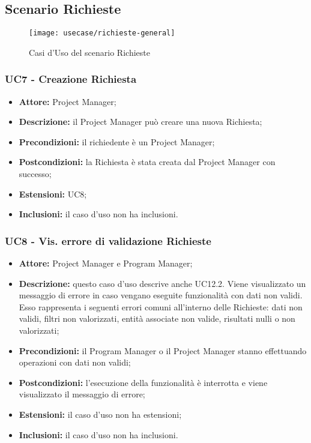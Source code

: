\subsection{Scenario Richieste}
\begin{figure}[H] 
    \centering 
    \texttt{[image: usecase/richieste-general]} 
    \caption{Casi d'Uso del scenario Richieste}
\end{figure}

\subsubsection*{UC7 - Creazione Richiesta}
\begin{itemize}[label=$\circ$]
\item \textbf{Attore:} Project Manager;
\item \textbf{Descrizione:} il Project Manager può creare una nuova Richiesta;
\item \textbf{Precondizioni:} il richiedente è un Project Manager;
\item \textbf{Postcondizioni:} la Richiesta è stata creata dal Project Manager con successo;
\item \textbf{Estensioni:} UC8;
\item \textbf{Inclusioni:} il caso d'uso non ha inclusioni.
\end{itemize}

\subsubsection*{UC8 - Vis. errore di validazione Richieste}
\begin{itemize}[label=$\circ$]
\item \textbf{Attore:} Project Manager e Program Manager;
\item \textbf{Descrizione:}  questo caso d'uso descrive anche UC12.2. Viene visualizzato un messaggio di errore in caso vengano eseguite funzionalità con dati non validi. Esso rappresenta i seguenti errori comuni all'interno delle Richieste: dati non validi, filtri non valorizzati, entità associate non valide, risultati nulli o non valorizzati;
\item \textbf{Precondizioni:} il Program Manager o il Project Manager stanno effettuando operazioni con dati non validi;
\item \textbf{Postcondizioni:} l'esecuzione della funzionalità è interrotta e viene visualizzato il messaggio di errore;
\item \textbf{Estensioni:} il caso d'uso non ha estensioni;
\item \textbf{Inclusioni:} il caso d'uso non ha inclusioni.
\end{itemize}

